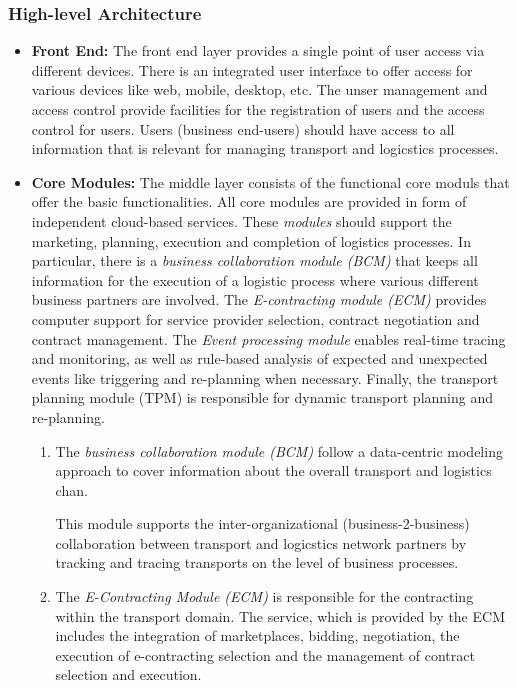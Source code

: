 \subsubsection{High-level Architecture}

\begin{itemize}
	\item \textbf{Front End:} The front end layer provides a single point of user access via different devices.
	  There is an integrated user interface to offer access for various devices like web, mobile, desktop, etc.
	   The unser management and access control provide facilities for the registration of users and the
		  access control for users. Users (business end-users) should have access to all information that is relevant 
			for managing transport and logicstics processes. 
 \item \textbf{Core Modules:} The middle layer consists of the functional core moduls that offer
			the basic functionalities. All core modules are provided in form of  independent cloud-based services.
			These \emph{modules} should support the marketing, planning, execution and completion of logistics processes.
			In particular, there is a \emph{business collaboration module (BCM)} that keeps all information for the
			execution of a logistic  process where various different business partners are involved. 
			The \emph{E-contracting module (ECM)} provides computer support for service provider selection,
			contract negotiation and contract management. The \emph{Event processing module} enables real-time tracing
			and monitoring, as well as rule-based analysis of expected and unexpected events like triggering and re-planning
			when necessary.
			Finally, the transport planning module (TPM) is responsible for dynamic transport planning and re-planning.
				\begin{enumerate}
					\item The \emph{business collaboration module (BCM)} follow a data-centric modeling approach to
					   cover information about the overall transport and logistics chan.
						
						 This module supports the inter-organizational (business-2-business) collaboration between
						transport and logicstics network partners by tracking and tracing transports on the level of
						 business processes. 
					\item The \emph{E-Contracting Module (ECM)} is responsible for the contracting within the transport domain.
					        The service, which is provided by the ECM includes the integration of marketplaces, bidding,
									 negotiation, the execution of e-contracting selection and the management of contract selection
									  and execution. 
					          

\end{enumerate}
\end{itemize}
